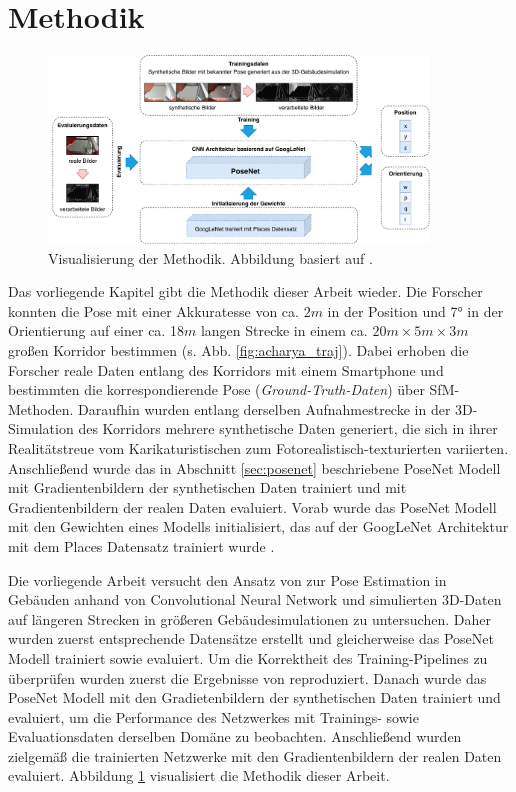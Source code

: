 
\section{Methodik}
\label{sec:kapitel_3}

\begin{figure}[t]
	\centering
	\includegraphics[width=0.9\textwidth]{images/methodik/methodik.pdf}
	\caption{Visualisierung der Methodik. Abbildung basiert auf \cite{acharyaBIMPoseNetIndoorCamera2019}.}
	\label{fig:methodik}
\end{figure}
Das vorliegende Kapitel gibt die Methodik dieser Arbeit wieder. Die Forscher \citet{acharyaBIMPoseNetIndoorCamera2019} konnten die Pose mit einer Akkuratesse von ca. $2m$ in der Position und 7° in der Orientierung auf einer ca. 18$m$ langen Strecke in einem ca. $20m \times 5m \times 3m$ großen Korridor bestimmen (s. Abb. \ref{fig:acharya_traj}). Dabei erhoben die Forscher reale Daten entlang des Korridors mit einem Smartphone  und bestimmten die korrespondierende Pose (\textit{Ground-Truth-Daten}) über SfM-Methoden. Daraufhin wurden entlang derselben Aufnahmestrecke in der 3D-Simulation des Korridors mehrere synthetische Daten generiert, die sich in ihrer Realitätstreue vom Karikaturistischen zum Fotorealistisch-texturierten variierten. Anschließend wurde das in Abschnitt \ref{sec:posenet} beschriebene PoseNet Modell mit Gradientenbildern der synthetischen Daten trainiert und mit Gradientenbildern der realen Daten evaluiert. Vorab wurde das PoseNet Modell mit den Gewichten eines Modells initialisiert, das auf der GoogLeNet Architektur mit dem Places Datensatz \cite{NIPS2014_5349} trainiert wurde \cite{acharyaBIMPoseNetIndoorCamera2019}. 

Die vorliegende Arbeit versucht den Ansatz von \citet{acharyaBIMPoseNetIndoorCamera2019} zur Pose Estimation in Gebäuden anhand von Convolutional Neural Network und simulierten 3D-Daten auf längeren Strecken in größeren Gebäudesimulationen zu untersuchen. Daher wurden zuerst entsprechende Datensätze erstellt und gleicherweise das PoseNet Modell trainiert sowie evaluiert. Um die Korrektheit des Training-Pipelines zu überprüfen wurden zuerst die Ergebnisse von \citet{acharyaBIMPoseNetIndoorCamera2019} reproduziert. Danach wurde das PoseNet Modell mit den Gradietenbildern der synthetischen Daten trainiert und evaluiert, um die Performance des Netzwerkes mit Trainings- sowie Evaluationsdaten derselben Domäne zu beobachten. Anschließend wurden zielgemäß die trainierten Netzwerke mit den Gradientenbildern der realen Daten evaluiert. Abbildung \ref{fig:methodik} visualisiert die Methodik dieser Arbeit.


